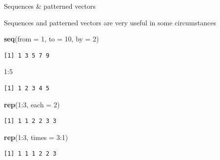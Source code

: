 \documentclass[10pt,ignorenonframetext,compress, aspectratio=169]{beamer}
\newenvironment{Shaded}{\begin{snugshade}}{\end{snugshade}}
\newcommand{\KeywordTok}[1]{\textcolor[rgb]{0.13,0.29,0.53}{\textbf{{#1}}}}
\newcommand{\DataTypeTok}[1]{\textcolor[rgb]{0.13,0.29,0.53}{{#1}}}
\newcommand{\DecValTok}[1]{\textcolor[rgb]{0.00,0.00,0.81}{{#1}}}
\newcommand{\NormalTok}[1]{{#1}}
\begin{document}
\begin{frame}[fragile]{Sequences \& patterned vectors}

Sequences and patterned vectors are very useful in some circumstances

\scriptsize

\begin{Shaded}
\begin{Highlighting}[]
\KeywordTok{seq}\NormalTok{(}\DataTypeTok{from =} \DecValTok{1}\NormalTok{, }\DataTypeTok{to =} \DecValTok{10}\NormalTok{, }\DataTypeTok{by =} \DecValTok{2}\NormalTok{)}
\end{Highlighting}
\end{Shaded}

\begin{verbatim}
[1] 1 3 5 7 9
\end{verbatim}

\begin{Shaded}
\begin{Highlighting}[]
\DecValTok{1}\NormalTok{:}\DecValTok{5}
\end{Highlighting}
\end{Shaded}

\begin{verbatim}
[1] 1 2 3 4 5
\end{verbatim}

\begin{Shaded}
\begin{Highlighting}[]
\KeywordTok{rep}\NormalTok{(}\DecValTok{1}\NormalTok{:}\DecValTok{3}\NormalTok{, }\DataTypeTok{each =} \DecValTok{2}\NormalTok{)}
\end{Highlighting}
\end{Shaded}

\begin{verbatim}
[1] 1 1 2 2 3 3
\end{verbatim}

\begin{Shaded}
\begin{Highlighting}[]
\KeywordTok{rep}\NormalTok{(}\DecValTok{1}\NormalTok{:}\DecValTok{3}\NormalTok{, }\DataTypeTok{times =} \DecValTok{3}\NormalTok{:}\DecValTok{1}\NormalTok{)}
\end{Highlighting}
\end{Shaded}

\begin{verbatim}
[1] 1 1 1 2 2 3
\end{verbatim}

\normalsize

\end{frame}
\end{document}
